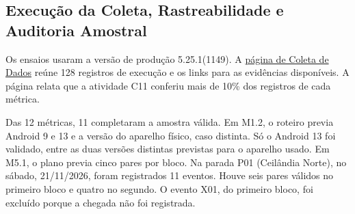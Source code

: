 \documentclass[11pt,a4paper]{article}
\begin{document}
\subsection{Execução da Coleta, Rastreabilidade e Auditoria Amostral}
\label{sec:coleta_execucao}

Os ensaios usaram a versão de produção 5.25.1(1149). A \href{https://fcte-qualidade-de-software-1.github.io/2026-2_T02_CAROL_SHAW/fase4/1-coleta/}{página de Coleta de Dados} reúne 128 registros de execução e os links para as evidências disponíveis. A página relata que a atividade C11 conferiu mais de 10\% dos registros de cada métrica.

Das 12 métricas, 11 completaram a amostra válida. Em M1.2, o roteiro previa Android 9 e 13 e a versão do aparelho físico, caso distinta. Só o Android 13 foi validado, entre as duas versões distintas previstas para o aparelho usado. Em M5.1, o plano previa cinco pares por bloco. Na parada P01 (Ceilândia Norte), no sábado, 21/11/2026, foram registrados 11 eventos. Houve seis pares válidos no primeiro bloco e quatro no segundo. O evento X01, do primeiro bloco, foi excluído porque a chegada não foi registrada.
\end{document}
